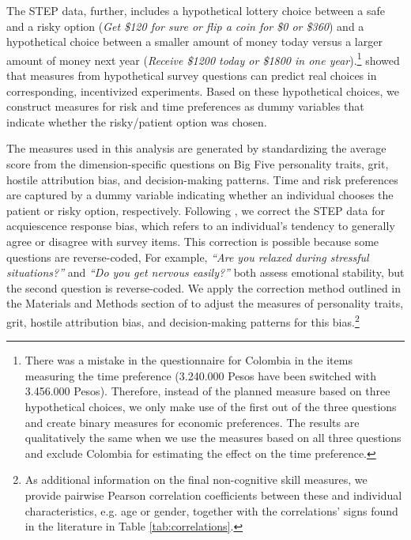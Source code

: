 The STEP data, further, includes a hypothetical lottery choice between a safe and a risky option (\textit{Get \$120 for sure or flip a coin for \$0 or \$360}) and a hypothetical choice between a smaller amount of money today versus a larger amount of money next year (\textit{Receive \$1200 today or \$1800 in one year}).\footnote{
	There was a mistake in the questionnaire for Colombia in the items measuring the time preference (3.240.000 Pesos have been switched with 3.456.000 Pesos). Therefore, instead of the planned measure based on three hypothetical choices, we only make use of the first out of the three questions and create binary measures for economic preferences. The results are qualitatively the same when we use the measures based on all three questions and exclude Colombia for estimating the effect on the time preference.
} \citet{falk_preference_2023} showed that measures from hypothetical survey questions can predict real choices in corresponding, incentivized experiments. Based on these hypothetical choices, we construct measures for risk and time preferences as dummy variables that indicate whether the risky/patient option was chosen.

The measures used in this analysis are generated by standardizing the average score from the dimension-specific questions on Big Five personality traits, grit, hostile attribution bias, and decision-making patterns. Time and risk preferences are captured by a dummy variable indicating whether an individual chooses the patient or risky option, respectively. Following \citet{laajaj_challenges_2019}, we correct the STEP data for acquiescence response bias, which refers to an individual's tendency to generally agree or disagree with survey items. This correction is possible because some questions are reverse-coded, For example, \textit{``Are you relaxed during stressful situations?''} and \textit{``Do you get nervous easily?''} both assess emotional stability, but the second question is reverse-coded. We apply the correction method outlined in the Materials and Methods section of \citet{laajaj_challenges_2019} to adjust the measures of personality traits, grit, hostile attribution bias, and decision-making patterns for this bias.\footnote{As additional information on the final non-cognitive skill measures, we provide pairwise Pearson correlation coefficients between these and individual characteristics, e.g. age or gender, together with the correlations' signs found in the literature in Table \ref{tab:correlations}.}



